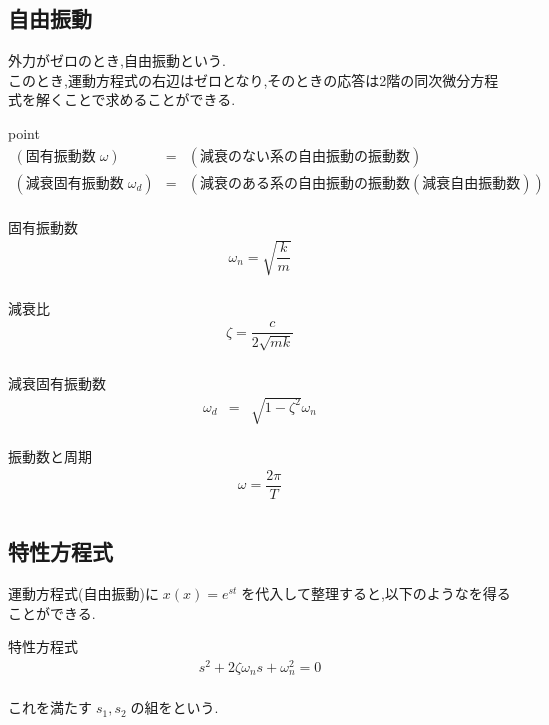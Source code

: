 \documentclass[a4paper]{jsarticle}
\begin{document}
\subsection{自由振動}
外力がゼロのとき,自由振動という.\\
このとき,運動方程式の右辺はゼロとなり,そのときの応答は2階の同次微分方程式を解くことで求めることができる.
\begin{itembox}[l]{point}
    \begin{eqnarray*}
        (固有振動数\;\omega)&=&(減衰のない系の自由振動の振動数)\\
        (減衰固有振動数\;\omega_d)&=&(減衰のある系の自由振動の振動数(減衰自由振動数))\\
    \end{eqnarray*}
\end{itembox}
\begin{itembox}[l]{固有振動数}
    \begin{eqnarray*}
        \omega_n = \sqrt{\dfrac{k}{m}}\\
    \end{eqnarray*}
\end{itembox}
\begin{itembox}[l]{減衰比}
    \begin{eqnarray*}
        \zeta = \dfrac{c}{2\sqrt{mk}}\\
    \end{eqnarray*}
\end{itembox}
\begin{itembox}[l]{減衰固有振動数}
    \begin{eqnarray*}
        \omega_d&=&\sqrt{1-\zeta^2}\omega_n\\
    \end{eqnarray*}
\end{itembox}
\begin{itembox}[l]{振動数と周期}
    \begin{eqnarray*}
        \omega=\dfrac{2\pi}{T}\\
    \end{eqnarray*}
\end{itembox}
\subsection{特性方程式}
運動方程式(自由振動)に$\; x\left(x\right)=e^{st}\;$を代入して整理すると,以下のようなを得ることができる.
\begin{itembox}[l]{特性方程式}
    \begin{eqnarray*}
        s^2+2\zeta\omega_ns+\omega_n^2=0\\
    \end{eqnarray*}
\end{itembox}
これを満たす$\; s_1,s_2\;$の組をという.
\end{document}
